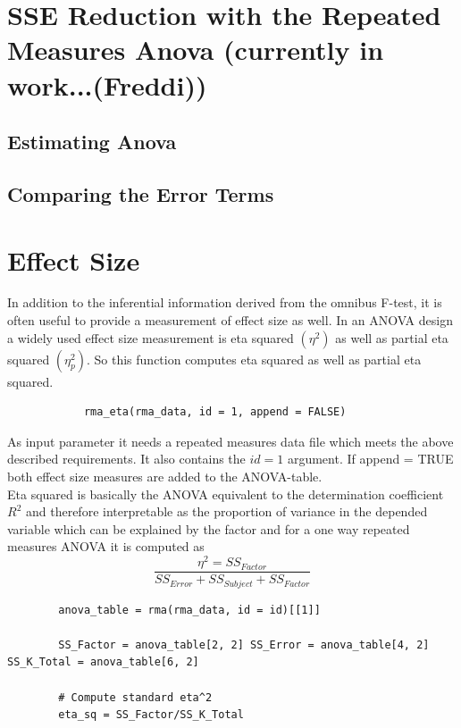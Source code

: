 \documentclass[11pt]{article}
\begin{document}
	
		
	\section{SSE Reduction with the Repeated Measures Anova  (currently in work...(Freddi)) }
			
		\subsection{Estimating Anova}
							
		\subsection{Comparing the Error Terms}
	
	\section{Effect Size} 
		In addition to the inferential information derived from the omnibus F-test, it is often useful to provide a measurement of effect size as well. In an ANOVA design a widely used effect size measurement is eta squared $(\eta^2)$ as well as partial eta squared $(\eta^2_p)$. So this function computes eta squared as well as partial eta squared.\\
		
		\begin{lstlisting}
			rma_eta(rma_data, id = 1, append = FALSE)
		\end{lstlisting}
		
		As input parameter it needs a repeated measures data file which meets the above described requirements. It also contains the $id = 1$ argument. If append = TRUE both effect size measures are added to the ANOVA-table.\\
		
		Eta squared is basically the ANOVA equivalent to the determination coefficient $𝑅^2$ and therefore interpretable as the proportion of variance in the depended variable which can be explained by the factor and for a one way repeated measures ANOVA it is computed as\\
		
		\begin{equation}
			\frac{\eta^2 = SS_{Factor}}{SS_{Error} + SS_{Subject} + SS_{Factor}}
		\end{equation}
		
		
		\begin{lstlisting}
		anova_table = rma(rma_data, id = id)[[1]]
		
		SS_Factor = anova_table[2, 2] SS_Error = anova_table[4, 2] SS_K_Total = anova_table[6, 2]
		
		# Compute standard eta^2
		eta_sq = SS_Factor/SS_K_Total
		\end{lstlisting}
		
\end{document}
